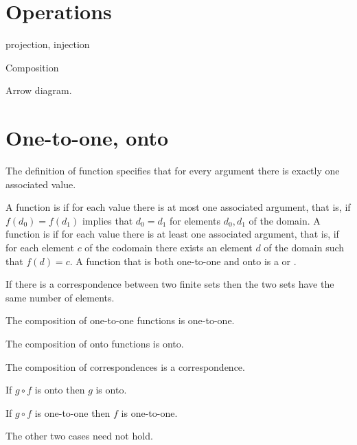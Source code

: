 \documentclass{ibl}
\begin{document}
\section{Operations}

\begin{df}
  projection, injection
\end{df}

Composition

Arrow diagram.





\section{One-to-one, onto}

The definition of function specifies that for every argument there is 
exactly one associated value.

\begin{df}
A function is  if for each value there is at most
one associated argument, that is, if $f(d_0)=f(d_1)$ implies that $d_0=d_1$
for elements $d_0,d_1$ of the domain.
A function is  if for each value there is at least
one associated argument, that is, if for each element $c$ of the codomain
there exists an element $d$ of the domain such that $f(d)=c$.
A function that is both one-to-one and onto is a 
 or .     
\end{df}

\begin{ex}
If there is a correspondence between two finite sets then the two sets
have the same number of elements.  
\end{ex}

\begin{ex}
\begin{exes}
\item The composition of one-to-one functions is one-to-one.
\item The composition of onto functions is onto.
\item The composition of correspondences is a correspondence.    
\end{exes}
\end{ex}

\begin{ex}
\begin{exes}
\item If $g\circ f$ is onto then $g$ is onto.
\item If $g\circ f$ is one-to-one then $f$ is one-to-one.
\item The other two cases need not hold.     
\end{exes}
\end{ex}
\end{document}
